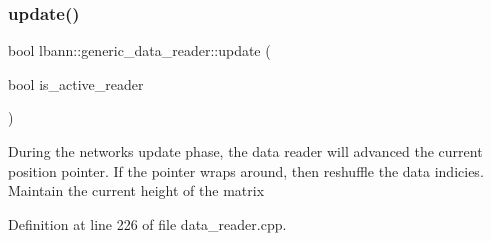 \subsubsection{\texorpdfstring{update()}{update()}}
{\footnotesize\ttfamily bool lbann\+::generic\+\_\+data\+\_\+reader\+::update (\begin{DoxyParamCaption}\item[{bool}]{is\+\_\+active\+\_\+reader }\end{DoxyParamCaption})\hspace{0.3cm}{\ttfamily [virtual]}}

During the network\textquotesingle{}s update phase, the data reader will advanced the current position pointer. If the pointer wraps around, then reshuffle the data indicies. Maintain the current height of the matrix 

Definition at line 226 of file data\+\_\+reader.\+cpp.


